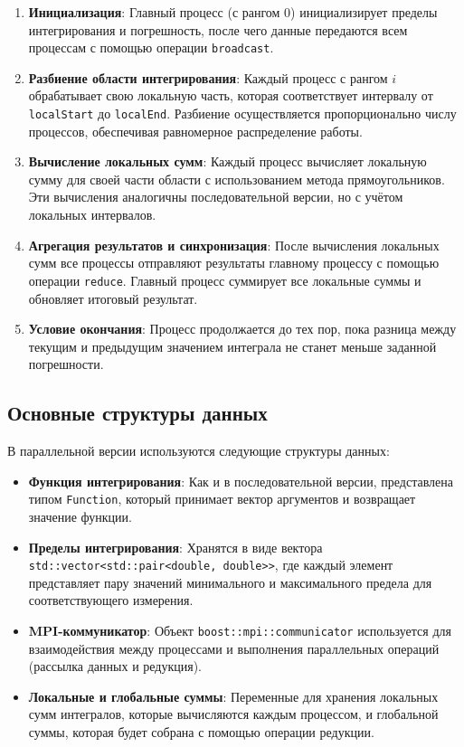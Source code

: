 \documentclass[12pt]{article}
\begin{document}
\begin{enumerate}
\item \textbf{Инициализация}: Главный процесс (с рангом 0) инициализирует пределы интегрирования и погрешность, после чего данные передаются всем процессам с помощью операции \texttt{broadcast}.
\item \textbf{Разбиение области интегрирования}: Каждый процесс с рангом \(i\) обрабатывает свою локальную часть, которая соответствует интервалу от \texttt{localStart} до \texttt{localEnd}. Разбиение осуществляется пропорционально числу процессов, обеспечивая равномерное распределение работы.
\item \textbf{Вычисление локальных сумм}: Каждый процесс вычисляет локальную сумму для своей части области с использованием метода прямоугольников. Эти вычисления аналогичны последовательной версии, но с учётом локальных интервалов.
\item \textbf{Агрегация результатов и синхронизация}: После вычисления локальных сумм все процессы отправляют результаты главному процессу с помощью операции \texttt{reduce}. Главный процесс суммирует все локальные суммы и обновляет итоговый результат.
\item \textbf{Условие окончания}: Процесс продолжается до тех пор, пока разница между текущим и предыдущим значением интеграла не станет меньше заданной погрешности.
\end{enumerate}

\subsection*{Основные структуры данных}

В параллельной версии используются следующие структуры данных:

\begin{itemize}
\item \textbf{Функция интегрирования}: Как и в последовательной версии, представлена типом \texttt{Function}, который принимает вектор аргументов и возвращает значение функции.
\item \textbf{Пределы интегрирования}: Хранятся в виде вектора \texttt{std::vector<std::pair<double, double>>}, где каждый элемент представляет пару значений минимального и максимального предела для соответствующего измерения.
\item \textbf{MPI-коммуникатор}: Объект \texttt{boost::mpi::communicator} используется для взаимодействия между процессами и выполнения параллельных операций (рассылка данных и редукция).
\item \textbf{Локальные и глобальные суммы}: Переменные для хранения локальных сумм интегралов, которые вычисляются каждым процессом, и глобальной суммы, которая будет собрана с помощью операции редукции.
\end{itemize}
\end{document}

